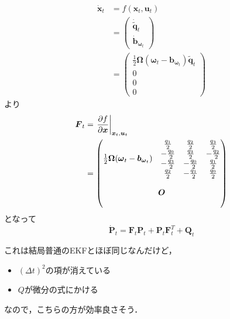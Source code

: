 \begin{align}
  \dot{\boldsymbol{x}}_{t}
  &=
  f(\boldsymbol{x}_{t}, \boldsymbol{u}_{t})\\
  &=
  \begin{pmatrix}
    \dot{\tilde{\boldsymbol{q}}}_{t}\\
    \dot{\boldsymbol{b}}_{\boldsymbol{\omega}_t}
  \end{pmatrix}\\
  &=
  \begin{pmatrix}
    \frac{1}{2}
    \boldsymbol{\Omega}(\boldsymbol{\omega}_t - \boldsymbol{b}_{\boldsymbol{\omega}_t})
    \tilde{\boldsymbol{q}}_{t}\\
    0\\
    0\\
    0
  \end{pmatrix}
\end{align}
より
\begin{align}
  \boldsymbol{F}_{t}
  &=
  \left. \frac{\partial f}{\partial \boldsymbol{x}}\right|_{\boldsymbol{x}_{t}, \boldsymbol{u}_{t}}\\
  &=
  \begin{pmatrix}
    \multicolumn{4}{c}{\multirow{4}{*}{$\frac{1}{2} \boldsymbol{\Omega}(\boldsymbol{\omega}_t - \boldsymbol{b}_{\boldsymbol{\omega}_t})$}} &  \frac{q_1}{2} &  \frac{q_2}{2} & \frac{q_3}{2}\\
    \multicolumn{4}{c}{} & -\frac{q_0}{2} &  \frac{q_3}{2} & -\frac{q_2}{2}\\
    \multicolumn{4}{c}{} & -\frac{q_3}{2} & -\frac{q_0}{2} &  \frac{q_1}{2}\\
    \multicolumn{4}{c}{} &  \frac{q_2}{2} & -\frac{q_1}{2} &  \frac{q_0}{2}\\
    \multicolumn{7}{c}{\multirow{3}{*}{$\boldsymbol{O}$}}\\
    \multicolumn{7}{c}{}\\
    \multicolumn{7}{c}{}
  \end{pmatrix}
\end{align}
となって
\begin{equation}
  \dot{\boldsymbol{P}}_{t} = \boldsymbol{F}_{t} \boldsymbol{P}_{t} + \boldsymbol{P}_{t} \boldsymbol{F}_{t}^{T} + \boldsymbol{Q}_{t}
\end{equation}

これは結局普通のEKFとほぼ同じなんだけど，
\begin{itemize}
  \item $(\Delta t)^2$の項が消えている
  \item $Q$が微分の式にかける
\end{itemize}
なので，こちらの方が効率良さそう．
